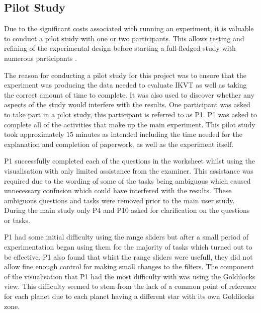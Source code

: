 \subsection{Pilot Study}
Due to the significant costs associated with running an experiment, it 
is valuable to conduct a pilot study with one or two 
participants. This allows testing and refining of the experimental
design before starting a full-fledged study with numerous 
participants \cite{kosara2003thoughts}. 

The reason for conducting a pilot study for this project was to ensure that
the experiment was producing the data needed to evaluate IKVT as well
as taking the correct amount of time to complete. It was also
used to discover whether any aspects of the study would
interfere with the results. One participant was asked to take part in a pilot
study, this participant is referred to as P1. P1 was asked to complete all of
the activities that
make up the main experiment. This pilot study took approximately 15 minutes as
intended including the time needed for the explanation and completion of
paperwork, as well as the experiment itself.

P1 successfully completed each of the questions in the worksheet whilst using
the visualisation with only
limited assistance from the examiner. This assistance was required due to the
wording of
some of the tasks being ambiguous which caused
unnecessary confusion which could have interfered with the results. These
ambiguous questions and
tasks were removed prior to the main user study. During the main study only P4
and P10 asked for clarification on the questions or tasks.

P1 had some initial difficulty using the range sliders but after a small period
of experimentation began using them for the majority of tasks which turned out
to be effective. P1 also found that whist the range sliders were usefull,
they did not allow fine enough control for making small changes to the filters.
The component
of the visualisation that P1 had the most difficulty with was using the
Goldilocks
view. This difficulty seemed to stem from the lack of a common point of
reference for each planet due to each planet having a different star with its
own Goldilocks zone.

